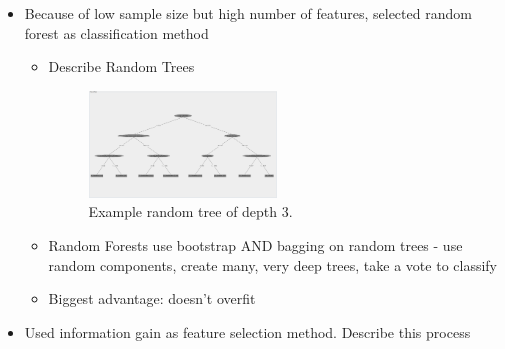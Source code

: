 \documentclass{article}
\begin{document}
\begin{itemize}
\item Because of low sample size but high number of features, selected random forest as classification method
    \begin{itemize}
    \item Describe Random Trees
    \begin{figure}[H]
    \centering
        \includegraphics[width=0.5\textwidth]{3_level_tree}
        \caption{Example random tree of depth 3.}
        \label{fig:ex_tree}
\end{figure}

    \item Random Forests use bootstrap AND bagging on random trees - use random components, create many, very deep trees, take a vote to classify
    \item Biggest advantage: doesn't overfit
    \end{itemize}

\item Used information gain as feature selection method.  Describe this process


\end{itemize}
\end{document}

